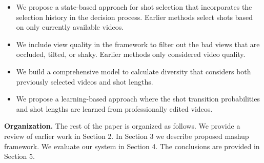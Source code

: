 \documentclass{sig-alternate-05-2015}
\begin{document}
 \begin{itemize} 
  \item We propose a state-based approach for shot selection that incorporates the selection history in the decision process. Earlier methods select shots based on only currently available videos.
  \item We include view quality in the framework to filter out the bad views that are occluded, tilted, or shaky. Earlier methods only considered video quality.
  \item We build a comprehensive model to calculate diversity that considers both previously selected videos and shot lengths.
  \item We propose a learning-based approach where the shot transition probabilities and shot lengths are learned from professionally edited videos.
 \end{itemize} 
\textbf{Organization.} The rest of the paper is organized as follows.
We provide a review of earlier work in Section 2. In Section 3 we
describe proposed mashup framework. We evaluate our system in
Section 4. The conclusions are provided in Section 5.
\end{document}
